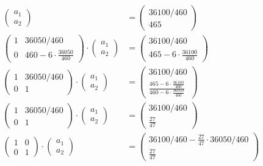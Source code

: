\begin{equation}
\begin{aligned}
\begin{pmatrix}
			a_1\\
			a_2
		\end{pmatrix}
		&=
		\begin{pmatrix}
			36100/460\\
			465
		\end{pmatrix}\\
		\begin{pmatrix}
			1 & 36050/460\\
			0 & 460 - 6 \cdot \frac{36050}{460}
		\end{pmatrix}
		\cdot
		\begin{pmatrix}
			a_1\\
			a_2
		\end{pmatrix}
		&=
		\begin{pmatrix}
			36100/460\\
			465-6 \cdot \frac{36100}{460}
		\end{pmatrix}\\
		\begin{pmatrix}
			1 & 36050/460\\
			0 & 1
		\end{pmatrix}
		\cdot
		\begin{pmatrix}
			a_1\\
			a_2
		\end{pmatrix}
		&=
		\begin{pmatrix}
			36100/460\\
			\frac{465-6 \cdot \frac{36100}{460}}{460 - 6 \cdot \frac{36050}{460}}
		\end{pmatrix}\\
		\begin{pmatrix}
			1 & 36050/460\\
			0 & 1
		\end{pmatrix}
		\cdot
		\begin{pmatrix}
			a_1\\
			a_2
		\end{pmatrix}
		&=
		\begin{pmatrix}
			36100/460\\
			\frac{27}{47}
		\end{pmatrix}\\
		\begin{pmatrix}
			1 & 0\\
			0 & 1
		\end{pmatrix}
		\cdot
		\begin{pmatrix}
			a_1\\
			a_2
		\end{pmatrix}
		&=
		\begin{pmatrix}
			36100/460-\frac{27}{47} \cdot 36050/460\\
			\frac{27}{47}
		\end{pmatrix}
	\end{aligned}
\end{equation}


